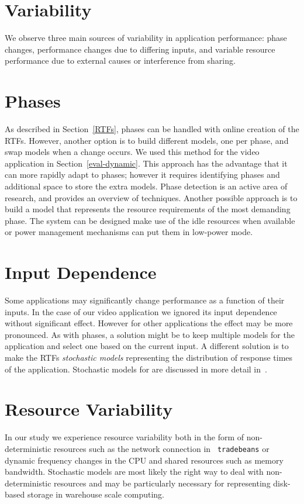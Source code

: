 \section{Variability}

We observe three main sources of variability in application performance: phase changes, performance changes due to differing inputs, and variable resource performance due to external causes or interference from sharing.

\section*{Phases}
As described in Section~\ref{RTFs}, phases can be handled with online creation of the RTFs.  However, another option is to build different models, one per phase, and swap models when a change occurs.  We used this method for the video application in Section~\ref{eval-dynamic}.  This approach has the advantage that it can more rapidly adapt to phases; however it requires identifying phases and additional space to store the extra models. Phase detection is an active area of research, and \cite{dhodapkar-micro03} provides an overview of techniques.  Another possible approach is to build a model that represents the resource requirements of the most demanding phase.  The system can be designed make use of the idle resources when available or power management mechanisms can put them in low-power mode.

\section*{Input Dependence}
Some applications may significantly change performance as a function of their inputs. In the case of our video application we ignored its input dependence without significant effect.  However for other applications the effect may be more pronounced. As with phases, a solution might be to keep multiple models for the application and select one based on the current input.  A different solution is to make the RTFs \emph{stochastic models} representing the distribution of response times of the application.  Stochastic models for \pacora are discussed in more detail in~\cite{pacora_tr}.

\section*{Resource Variability}
In our study we experience resource variability both in the form of non-deterministic resources such as the network connection in \texttt{ tradebeans} or dynamic frequency changes in the CPU and shared resources such as memory bandwidth. Stochastic models are most likely the right way to deal with non-deterministic resources and may be particularly necessary for representing disk-based storage in warehouse scale computing.

